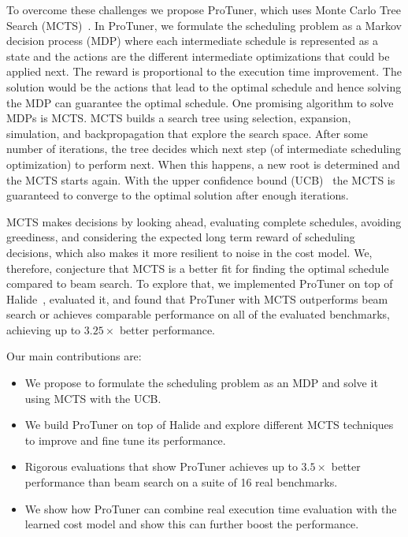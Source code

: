 To overcome these challenges we propose ProTuner, which uses Monte Carlo Tree Search (MCTS)~\cite{browne2012survey}. In ProTuner, we formulate the scheduling problem as a Markov decision process (MDP) where each intermediate schedule is represented as a state and the actions are the different intermediate optimizations that could be applied next. The reward is proportional to the execution time improvement. The solution would be the actions that lead to the optimal schedule and hence solving the MDP can guarantee the optimal schedule. One promising algorithm to solve MDPs is MCTS. MCTS builds a search tree using selection, expansion, simulation, and backpropagation that explore the search space. After some number of iterations, the tree decides which next step (of intermediate scheduling optimization) to perform next. When this happens, a new root is determined and the MCTS starts again. With the upper confidence bound (UCB)~\cite{auer2002finite} the MCTS is guaranteed to converge to the optimal solution after enough iterations.

MCTS makes decisions by looking ahead, evaluating complete schedules, avoiding greediness, and considering the expected long term reward of scheduling decisions, which also makes it more resilient to noise in the cost model. We, therefore, conjecture that MCTS is a better fit for finding the optimal schedule compared to beam search. To explore that, we implemented ProTuner on top of Halide~\cite{ragan2013halide}, evaluated it, and found that ProTuner with MCTS outperforms beam search or achieves comparable performance on all of the evaluated benchmarks, achieving up to $3.25\times$ better performance. %

Our main contributions are:
\begin{itemize}
    \item We propose to formulate the scheduling problem as an MDP and solve it using MCTS with the UCB.
    \item We build ProTuner on top of Halide and explore different MCTS techniques to improve and fine tune its performance.
    \item Rigorous evaluations that show ProTuner achieves up to $3.5\times$ better performance than beam search on a suite of 16 real benchmarks.
    \item We show how ProTuner can combine real execution time evaluation with the learned cost model and show this can further boost the performance.
\end{itemize}